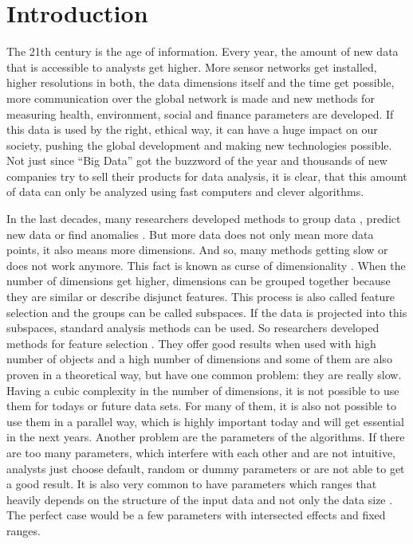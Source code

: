 \chapter{Introduction}\label{chap:introduction}
The 21th century is the age of information. Every year, the amount of new data that is accessible to analysts get higher. More sensor networks get installed, higher resolutions in both, the data dimensions itself and the time get possible, more communication over the global network is made and new methods for measuring health, environment, social and finance parameters are developed. If this data is used by the right, ethical way, it can have a huge impact on our society, pushing the global development and making new technologies possible. Not just since ``Big Data'' got the buzzword of the year and thousands of new companies try to sell their products for data analysis, it is clear, that this amount of data can only be analyzed using fast computers and clever algorithms.

In the last decades, many researchers developed methods to group data \cite{dbscan}, predict new data \cite{c45} or find anomalies \cite{lof}. But more data does not only mean more data points, it also means more dimensions. And so, many methods getting slow or does not work anymore. This fact is known as curse of dimensionality \cite{curse1,curse2}. When the number of dimensions get higher, dimensions can be grouped together because they are similar or describe disjunct features. This process is also called feature selection and the groups can be called subspaces. If the data is projected into this subspaces, standard analysis methods can be used. So researchers developed methods for feature selection \cite{enclus,hics}. They offer good results when used with high number of objects and a high number of dimensions and some of them are also proven in a theoretical way, but have one common problem: they are really slow. Having a cubic complexity in the number of dimensions, it is not possible to use them for todays or future data sets. For many of them, it is also not possible to use them in a parallel way, which is highly important today and will get essential in the next years. Another problem are the parameters of the algorithms. If there are too many parameters, which interfere with each other and are not intuitive, analysts just choose default, random or dummy parameters or are not able to get a good result. It is also very common to have parameters which ranges that heavily depends on the structure of the input data and not only the data size \cite{enclus}. The perfect case would be a few parameters with intersected effects and fixed ranges.


